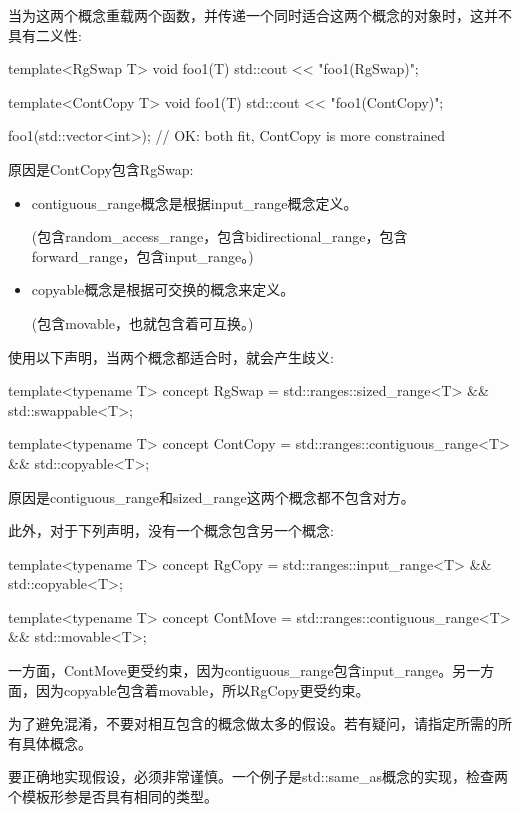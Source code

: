 当为这两个概念重载两个函数，并传递一个同时适合这两个概念的对象时，这并不具有二义性:

\begin{cpp}
template<RgSwap T>
void foo1(T) {
	std::cout << "foo1(RgSwap)\n";
}

template<ContCopy T>
void foo1(T) {
	std::cout << "foo1(ContCopy)\n";
}

foo1(std::vector<int>{}); // OK: both fit, ContCopy is more constrained
\end{cpp}

原因是ContCopy包含RgSwap:

\begin{itemize}
\item
contiguous\_range概念是根据input\_range概念定义。

(包含random\_access\_range，包含bidirectional\_range，包含forward\_range，包含input\_range。)

\item
copyable概念是根据可交换的概念来定义。

(包含movable，也就包含着可互换。)
\end{itemize}

使用以下声明，当两个概念都适合时，就会产生歧义:

\begin{cpp}
template<typename T>
concept RgSwap = std::ranges::sized_range<T> && std::swappable<T>;

template<typename T>
concept ContCopy = std::ranges::contiguous_range<T> && std::copyable<T>;
\end{cpp}

原因是contiguous\_range和sized\_range这两个概念都不包含对方。

此外，对于下列声明，没有一个概念包含另一个概念:

\begin{cpp}
template<typename T>
concept RgCopy = std::ranges::input_range<T> && std::copyable<T>;

template<typename T>
concept ContMove = std::ranges::contiguous_range<T> && std::movable<T>;
\end{cpp}

一方面，ContMove更受约束，因为contiguous\_range包含input\_range。另一方面，因为copyable包含着movable，所以RgCopy更受约束。

为了避免混淆，不要对相互包含的概念做太多的假设。若有疑问，请指定所需的所有具体概念。


要正确地实现假设，必须非常谨慎。一个例子是std::same\_as概念的实现，检查两个模板形参是否具有相同的类型。

